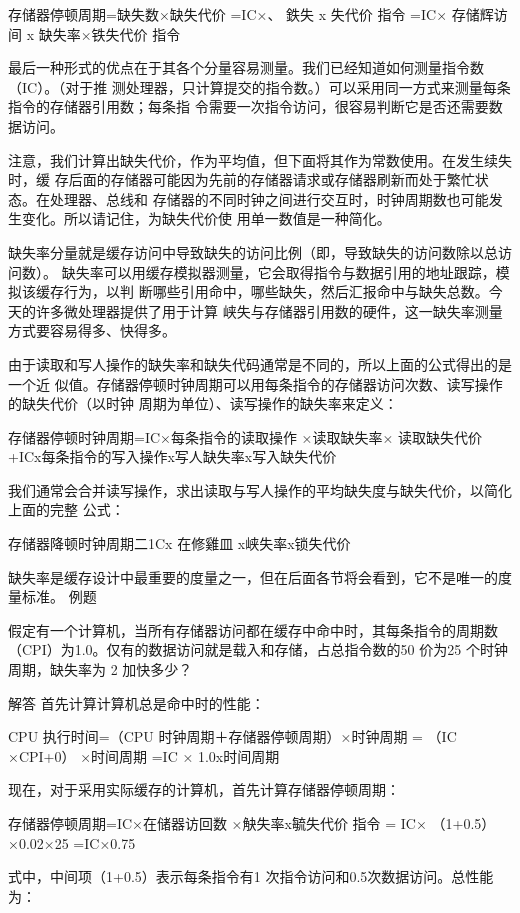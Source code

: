 存储器停顿周期=缺失数×缺失代价
=IC×、
鉄失 x 失代价
指令
=IC× 存储辉访间 x 缺失率×铁失代价
指令

最后一种形式的优点在于其各个分量容易测量。我们已经知道如何测量指令数（IC）。（对于推
测处理器，只计算提交的指令数。）可以采用同一方式来测量每条指令的存储器引用数；每条指
令需要一次指令访问，很容易判断它是否还需要数据访问。

注意，我们计算出缺失代价，作为平均值，但下面将其作为常数使用。在发生续失时，缓
存后面的存储器可能因为先前的存储器请求或存储器刷新而处于繁忙状态。在处理器、总线和
存储器的不同时钟之间进行交互时，时钟周期数也可能发生变化。所以请记住，为缺失代价使
用单一数值是一种简化。

缺失率分量就是缓存访问中导致缺失的访问比例（即，导致缺失的访问数除以总访问数）。
缺失率可以用缓存模拟器测量，它会取得指令与数据引用的地址跟踪，模拟该缓存行为，以判
断哪些引用命中，哪些缺失，然后汇报命中与缺失总数。今天的许多微处理器提供了用于计算
峡失与存储器引用数的硬件，这一缺失率测量方式要容易得多、快得多。

由于读取和写人操作的缺失率和缺失代码通常是不同的，所以上面的公式得出的是一个近
似值。存储器停顿时钟周期可以用每条指令的存储器访问次数、读写操作的缺失代价（以时钟
周期为单位）、读写操作的缺失率来定义：

存储器停顿时钟周期=IC×每条指令的读取操作 ×读取缺失率× 读取缺失代价
+ICx每条指令的写入操作x写人缺失率x写入缺失代价

我们通常会合并读写操作，求出读取与写人操作的平均缺失度与缺失代价，以简化上面的完整
公式：

存储器降顿时钟周期二1Cx 在修雞皿 x峡失率x锁失代价

缺失率是缓存设计中最重要的度量之一，但在后面各节将会看到，它不是唯一的度量标准。
例题

假定有一个计算机，当所有存储器访问都在缓存中命中时，其每条指令的周期数
（CPI）为1.0。仅有的数据访问就是载入和存储，占总指令数的50%
价为25 个时钟周期，缺失率为 2%
加快多少？

解答
首先计算计算机总是命中时的性能：

CPU 执行时间=（CPU 时钟周期＋存储器停顿周期）×时钟周期
= （IC ×CPI+0） ×时间周期
=IC × 1.0x时间周期

现在，对于采用实际缓存的计算机，首先计算存储器停顿周期：

存储器停顿周期=IC×在储器访回数 ×觖失率x毓失代价
指令
= IC× （1+0.5）×0.02×25
=IC×0.75

式中，中间项（1+0.5）表示每条指令有1 次指令访问和0.5次数据访问。总性能
为：

